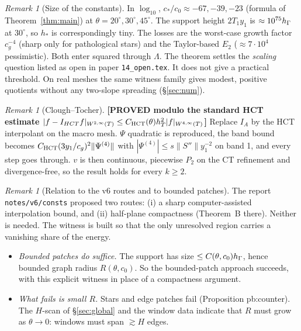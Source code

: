 \documentclass[11pt]{article}
\theoremstyle{remark}\newtheorem{remark}[theorem]{Remark}
\newcommand{\norm}[1]{\|#1\|}\newcommand{\ip}[2]{\langle #1,#2\rangle}\DeclareMathOperator{\curl}{curl}\DeclareMathOperator{\diam}{diam}
\newcommand{\lab}[1]{\textbf{[#1]}}
\begin{document}
\begin{remark}[Size of the constants]
In $\log_{10}$, $c_\ast/c_0\approx-67,-39,-23$ (formula of Theorem~\ref{thm:main}) at $\theta=20^\circ,30^\circ,45^\circ$. The support height $2T_1y_1$ is
$\approx10^{75}h_\Gamma$ at $30^\circ$, so $h_\ast$ is correspondingly tiny. The losses are the worst-case growth factor
$c_g^{-4}$ (sharp only for pathological stars) and the Taylor-based $E_2$ ($\approx7\cdot10^4$ pessimistic). Both enter
squared through $\Lambda$. The theorem settles the \emph{scaling} question listed as open in paper \texttt{14\_open.tex}. It
does not give a practical threshold. On real meshes the same witness family gives modest, positive quotients without any
two-slope spreading (\S\ref{sec:num}).
\end{remark}
\begin{remark}[Clough--Tocher]\lab{PROVED modulo the standard HCT estimate $|f-I_{HCT}f|_{W^{2,\infty}(T)}\le C_{\rm HCT}(\theta)h_T^2|f|_{W^{4,\infty}(T)}$}
Replace $I_A$ by the HCT interpolant on the macro mesh. $\Psi$ quadratic is reproduced, the band bound becomes
$C_{\rm HCT}(3y_1/c_g)^2\norm{\Psi^{(4)}}$ with $|\Psi^{(4)}|\le s\norm{S''}y_1^{-2}$ on band 1, and every step goes through.
$v$ is then continuous, piecewise $P_2$ on the CT refinement and divergence-free, so the result holds for every $k\ge2$.
\end{remark}
\begin{remark}[Relation to the v6 routes and to bounded patches]
The report \texttt{notes/v6/consts} proposed two routes: (i) a sharp computer-assisted interpolation bound, and (ii)
half-plane compactness (Theorem~B there). Neither is needed. The witness is built so that the only unresolved region carries
a vanishing share of the energy.
\begin{itemize}
\item \emph{Bounded patches do suffice.} The support has size $\le C(\theta,c_0)h_\Gamma$, hence bounded graph radius
  $R(\theta,c_0)$. So the bounded-patch approach succeeds, with this explicit witness in place of a compactness argument.
\item \emph{What fails is small $R$.} Stars and edge patches fail (Proposition pb:counter). The $H$-scan of
  \S\ref{sec:global} and the window data indicate that $R$ must grow as $\theta\to0$: windows must span $\gtrsim H$ edges.
\end{itemize}
\end{remark}
\end{document}
